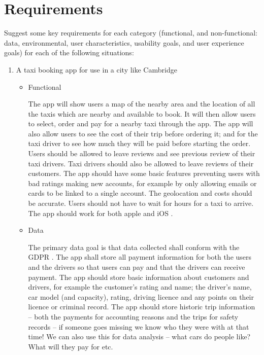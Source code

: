 \documentclass[10pt,\jkfside,a4paper]{article}
\begin{document}
\section{Requirements}

Suggest some key requirements for each category (functional, and non-functional: data, environmental,
user characteristics, usability goals, and user experience goals) for each of the following situations:

\begin{enumerate}[label=(\alph*)]

\item A taxi booking app for use in a city like Cambridge

\begin{itemize}

\item Functional

The app will show users a map of the nearby area and the location of all
the taxis which are nearby and available to book.
It will then allow users to select, order and pay for a nearby taxi through the app.
The app will also allow users to see the cost of their trip before ordering it; and
for the taxi driver to see how much they will be paid before starting the order.
Users should be allowed to leave reviews and see previous review of their taxi drivers.
Taxi drivers should also be allowed to leave reviews of their customers.
The app should have some basic features preventing users with bad ratings making new
accounts, for example by only allowing emails or cards to be linked to a single account.
The geolocation and costs should be accurate. Users should not have to wait for hours for
a taxi to arrive.
The app should work for both apple and iOS .

\item Data

The primary data goal is that data collected shall conform with the GDPR .
The app shall store all payment information for both the users and the drivers so that users can pay and that the
drivers can receive payment. The app should store basic information about customers and drivers, for example the
customer's rating and name; the driver's name, car model (and capacity), rating, driving licence and any points on
their licence or criminal record. The app should store historic trip information -- both the payments for accounting
reasons and the trips for safety records -- if someone goes missing we know who they were with at that time! We can
also use this for data analysis -- what cars do people like? What will they pay for etc.


\end{itemize}
\end{enumerate}
\end{document}

